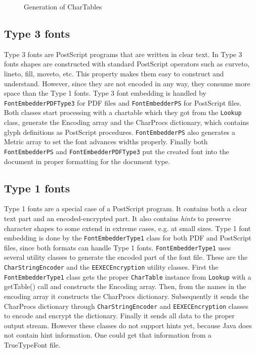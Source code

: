 \documentclass[a4paper]{article}
\newcommand{\class}[1]{\texttt{#1}}
\newcommand{\fhclass}[1]{\class{#1}}
\newcommand{\method}[1]{\textsf{#1}}
\newcommand{\techterm}[1]{\textit{#1}}
\newcommand{\ps}{PostScript}
\newcommand{\pdf}{PDF}
\newcommand{\syntax}[1]{\textsf{#1}}
\begin{document}
\begin{figure}[htbo]
\caption{Generation of CharTables}
\label{ctgen}
\end{figure}


\subsection{Type 3 fonts}

Type 3 fonts are \ps{} programs that are written in clear text. In
Type 3 fonts shapes are constructed with standard \ps{} operators such as
curveto, lineto, fill, moveto, etc. This property makes them easy to
construct and understand. However, since they are not encoded in any way, they
consume more space than the Type 1 fonts. Type 3 font embedding is
handled by \fhclass{FontEmbedderPDFType3} for \pdf{} files and \fhclass{FontEmbedderPS} for
\ps{} files. Both classes start processing with a chartable which they
got from the \fhclass{Lookup} class, generate the Encoding array and
the \syntax{CharProcs} dictionary, which contains glyph definitions as
\ps{} procedures. \fhclass{FontEmbedderPS} also generates a
\syntax{Metric} array to set the font advances widths properly. Finally
both \fhclass{FontEmbedderPS} and  \fhclass{FontEmbedderPDFType3} put
the created font into the document in proper formatting for the
document type.


\subsection{Type 1 fonts}

Type 1 \cite{type1} fonts are a special case of a \ps{} program. It
contains both a clear text part and an encoded-encrypted part. It also
contains \techterm{hints} to preserve character shapes to some extend in
extreme cases, e.g. at small sizes. Type 1 font embedding is done by the
\fhclass{FontEmbedderType1}
class for both \pdf{} and \ps{} files, since both formats can handle
Type 1 fonts. \fhclass{FontEmbedderType1} uses several
utility classes to generate the encoded part of the font file. These
are the \fhclass{CharStringEncoder} and the \fhclass{EEXECEncryption}
utility classes. First the \fhclass{FontEmbedderType1} class gets
the proper \fhclass{CharTable} instance from \fhclass{Lookup} with a
\method{getTable()} call and constructs the Encoding array. Then, from 
the names in the encoding array it constructs the \syntax{CharProcs}
dictionary. Subsequently it sends the \syntax{CharProcs} dictionary
through \fhclass{CharStringEncoder} and \fhclass{EEXECEncryption}
classes to encode and encrypt the dictionary. Finally it sends all
data to the proper output stream. However these classes do not support
hints yet, because Java does not contain hint information. One could
get that information from a TrueTypeFont file.
\end{document}
